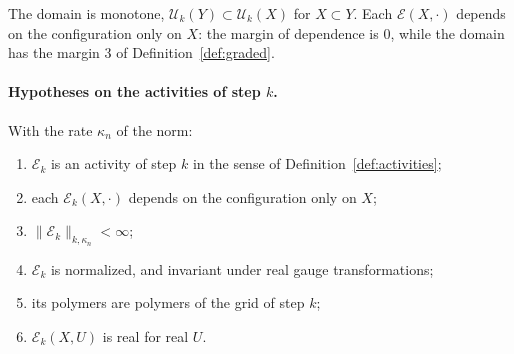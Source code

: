 The domain is monotone, $\mathcal U_k(Y)\subset\mathcal U_k(X)$ for $X\subset Y$. Each $\mathcal E(X,\cdot)$ depends on the configuration only on $X$: the margin of dependence is $0$, while the domain has the margin $3$ of Definition~\ref{def:graded}.

\paragraph{Hypotheses on the activities of step $k$.} With the rate $\kappa_n$ of the norm:
\begin{enumerate}[label=(H\arabic*)]
\item $\mathcal E_k$ is an activity of step $k$ in the sense of Definition~\ref{def:activities};
\item each $\mathcal E_k(X,\cdot)$ depends on the configuration only on $X$;
\item $\|\mathcal E_k\|_{k,\kappa_n}<\infty$;
\item $\mathcal E_k$ is normalized, and invariant under real gauge transformations;
\item its polymers are polymers of the grid of step $k$;
\item $\mathcal E_k(X,U)$ is real for real $U$.
\end{enumerate}

